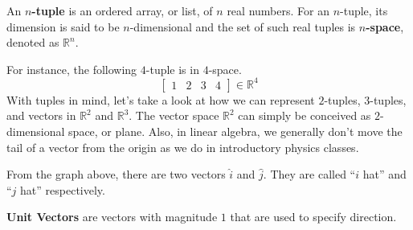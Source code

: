 \documentclass[../main.tex]{subfiles}
\begin{document}
\begin{definition}
An \textbf{$n$-tuple} is an ordered array, or list, of $n$ real
numbers. For an $n$-tuple, its dimension is said to be $n$-dimensional
and the set of such real tuples is \textbf{$n$-space}, denoted as
$\mathbb{R}^n$.
\end{definition}

For instance, the following $4$-tuple is in $4$-space.
\[
\begin{bmatrix}
    1 & 2 & 3 & 4
\end{bmatrix}
\in
\mathbb{R}^4
\]
With tuples in mind, let's take a look at how we can represent
$2$-tuples, $3$-tuples, and vectors in $\mathbb{R}^2$ and
$\mathbb{R}^3$. The vector space $\mathbb{R}^2$ can simply be
conceived as $2$-dimensional space, or plane. Also, in linear
algebra, we generally don't move the tail of a vector from the origin
as we do in introductory physics classes.

\begin{figure}[H]
\centering
{}
\end{figure}

From the graph above, there are two vectors $\hat{i}$ and $\hat{j}$.
They are called ``$i$ hat'' and ``$j$ hat'' respectively.

\begin{definition}
\textbf{Unit Vectors} are vectors with magnitude $1$ that are used to
specify direction.
\end{definition}
\end{document}
